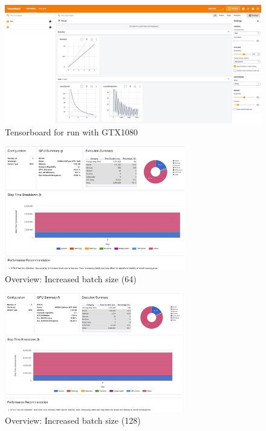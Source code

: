 \documentclass[12pt, a4paper, hidelinks]{article}
\begin{document}
\begin{figure}[H]
\centering
\includegraphics[width=1\textwidth]{./assets/scap_gtx1080_tensorboard_14615343}
\caption*{Tensorboard for run with GTX1080}
\label{fig:scap_gtx1080_tensorboard_14615343}
\end{figure}

\begin{figure}[H]
\centering
\includegraphics[width=0.7\textwidth]{./assets/scap_gtx1080_profiler-torch_batch-size-64_14650758}
\caption[test]{Overview: Increased batch size (64)}
\label{fig:scap_gtx1080_profiler-torch_batch-size-64_14650758}
\end{figure}

\begin{figure}[H]
\centering
\includegraphics[width=0.7\textwidth]{./assets/scap_gtx1080_profiler-torch_batch-size-128_14650759}
\caption[]{Overview: Increased batch size (128)}
\label{fig:scap_gtx1080_profiler-torch_batch-size-128_14650759}
\end{figure}
\end{document}
